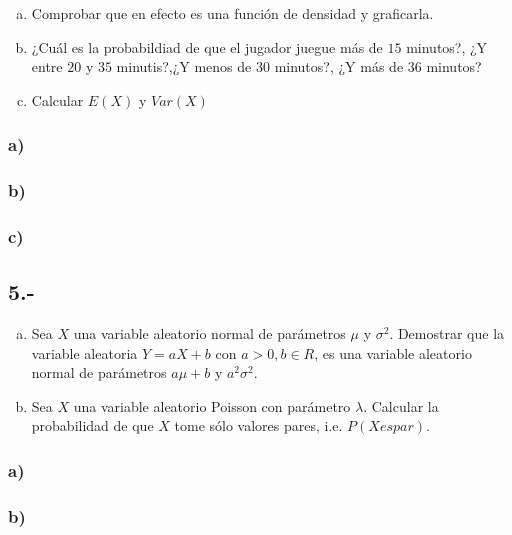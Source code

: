 \documentclass{article}
\begin{document}
\begin{enumerate}[a)]
    \item Comprobar que en efecto es una función de densidad y graficarla.
    \item ¿Cuál es la probabildiad de que el jugador juegue más de $15$ minutos?, ¿Y entre $20$ y $35$ minutis?,¿Y menos de $30$ minutos?,
    ¿Y más de $36$ minutos?
    \item Calcular $E(X)$ y $Var(X)$
\end{enumerate}
\begin{tcolorbox}[breakable]
    \subsubsection*{a)}

    \subsubsection*{b)}

    \subsubsection*{c)}
\end{tcolorbox}

\subsection*{5.-}
\begin{enumerate}[a)]    
    \item Sea $X$ una variable aleatorio normal de parámetros $\mu$ y $\sigma^2$. Demostrar que la variable aleatoria $Y = aX+b$ con $a>0,b\in R$, 
    es una variable aleatorio normal de parámetros $a\mu +b$ y $a^2\sigma^2$.
    \item Sea $X$ una variable aleatorio Poisson con parámetro $\lambda$. Calcular la probabilidad de que $X$ tome sólo valores pares, i.e. $P(X es par)$.
\end{enumerate}
\begin{tcolorbox}[breakable]
    \subsubsection*{a)}

    \subsubsection*{b)}
\end{tcolorbox}
\end{document}
